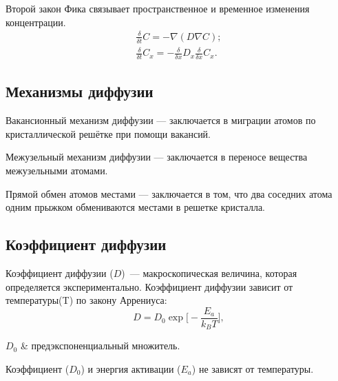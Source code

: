 Второй закон Фика связывает пространственное и временное изменения концентрации.
\begin{gather}
	\frac{\delta}{\delta t}C = - \nabla (D \nabla C);\\
	\frac{\delta}{\delta t}C_{x} = - \frac{\delta}{\delta x} D_{x} \frac{\delta}{\delta x} C_{x}.
\end{gather}

\subsection{Механизмы диффузии}

Вакансионный механизм диффузии — заключается в миграции атомов по кристаллической решётке при помощи вакансий.

Межузельный механизм диффузии — заключается в переносе вещества межузельными атомами.

Прямой обмен атомов местами — заключается в том, что два соседних атома одним прыжком обмениваются местами в решетке кристалла.

\subsection{Коэффициент диффузии}


Коэффициент диффузии ($D$)~--- макроскопическая величина, которая определяется экспериментально. Коэффициент диффузии зависит от температуры(T) по закону Аррениуса:
\begin{equation}
	D = D_{0}\exp\bigg[-\frac{E_{a}}{k_{B}T}\bigg],
\end{equation}
\begin{conditions}
	$D_{0}$ & предэкспоненциальный множитель.
\end{conditions}
Коэффициент ($D_{0}$) и энергия активации ($E_{a}$) не зависят от температуры.

